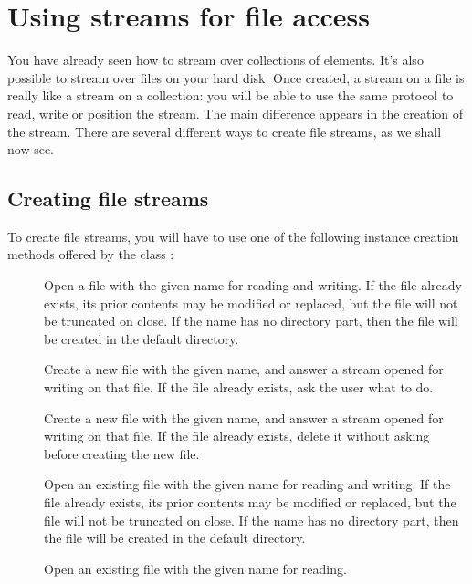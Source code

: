\documentclass[a4paper,10pt,twoside]{book}
\begin{document}
\section{Using streams for file access}

You have already seen how to stream over collections of elements. It's
also possible to stream over files on your hard disk.
Once created, a stream on a file is really like a stream on a
collection: you will be able to use the same protocol to read, write
or position the stream.
The main difference appears in the creation of the stream.
There are several different ways to create file streams, as we shall now see.

\subsection{Creating file streams}

To create file streams, you will have to use one of the following
instance creation methods offered by the class :

\begin{description}

\item[] Open a file with the given name for reading and
  writing. If the file already exists, its prior contents may be
  modified or replaced, but the file will not be truncated on
  close. If the name has no directory part, then the file will be
  created in the default directory.
  
\item[] Create a new file with the given name,
  and answer a stream opened for writing on that file. If the file
  already exists, ask the user what to do.
  
\item[] Create a new file with the given
  name, and answer a stream opened for writing on that file. If the
  file already exists, delete it without asking before creating the
  new file.

\item[] Open an existing file with the given
  name for reading and writing. If the file already exists, its prior
  contents may be modified or replaced, but the file will not be
  truncated on close. If the name has no directory part, then the file
  will be created in the default directory.

\item[] Open an existing file with the
  given name for reading.

\end{description}
\end{document}
